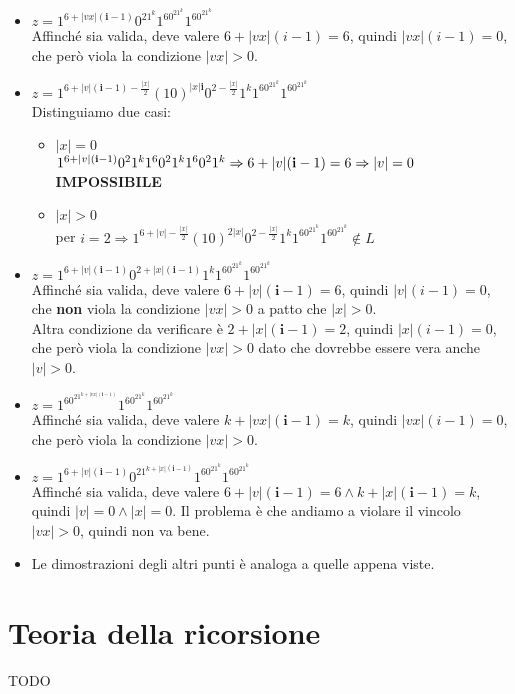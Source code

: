\documentclass[a4paper,oneside]{scrbook}
\newcommand{\greenmark}{\quad \textcolor{green}{\checkmark}}
\begin{document}
\begin{itemize}
	\item $z=1^{6+|vx|(\textbf{i}-1)}0^21^k1^60^21^k1^60^21^k$\\
	Affinché sia valida, deve valere $6+|vx|(i-1)=6$, quindi $|vx|(i-1)=0$, che però viola la condizione $|vx|>0$. \greenmark
	
	\item $z=1^{6+|v|(\textbf{i}-1)-\frac{|x|}{2}}(10)^{|x|\textbf{i}}0^{2-\frac{|x|}{2}}1^k1^60^21^k1^60^21^k$\\
	Distinguiamo due casi:
	\begin{itemize}
		\item $|x|=0$\\
		$1^{6+|v|(\textbf{i}-1)}0^21^k1^60^21^k1^60^21^k \Rightarrow \\6+|v|(\textbf{i}-1)=6 \Rightarrow |v|=0$ \textbf{IMPOSSIBILE} \greenmark
		\item $|x|>0$\\
		per $i=2 \Rightarrow 1^{6+|v|-\frac{|x|}{2}}(10)^{2|x|}0^{2-\frac{|x|}{2}}1^k1^60^21^k1^60^21^k \notin L$ \greenmark
	\end{itemize}
	
	\item $z=1^{6+|v|(\textbf{i}-1)}0^{2+|x|(\textbf{i}-1)}1^k1^60^21^k1^60^21^k$\\
	Affinché sia valida, deve valere $6+|v|(\textbf{i}-1)=6$, quindi $|v|(i-1)=0$, che \textbf{non} viola la condizione $|vx|>0$ a patto che $|x|>0$.\\
	Altra condizione da verificare è $2+|x|(\textbf{i}-1)=2$, quindi $|x|(i-1)=0$, che però viola la condizione $|vx|>0$ dato che dovrebbe essere vera anche $|v|>0$. \greenmark
	
	\item $z=1^60^21^{k+|vx|(\textbf{i}-1)}1^60^21^k1^60^21^k$\\
	Affinché sia valida, deve valere $k+|vx|(\textbf{i}-1)=k$, quindi $|vx|(i-1)=0$, che però viola la condizione $|vx|>0$. \greenmark
	
	\item $z=1^{6+|v|(\textbf{i}-1)}0^21^{k+|x|(\textbf{i}-1)}1^60^21^k1^60^21^k$\\
	Affinché sia valida, deve valere $6+|v|(\textbf{i}-1)=6 \wedge k+|x|(\textbf{i}-1)=k$, quindi $|v|=0 \wedge |x|=0$. Il problema è che andiamo a violare il vincolo $|vx|>0$, quindi non va bene. \greenmark
	
	\item Le dimostrazioni degli altri punti è analoga a quelle appena viste.
\end{itemize}

\chapter{Teoria della ricorsione}
TODO
\end{document}
